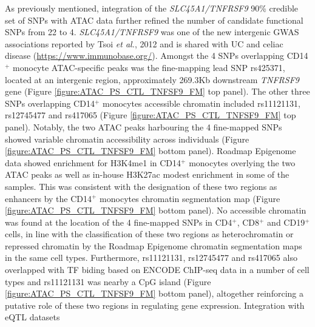 As previously mentioned, integration of the \textit{SLC45A1/TNFRSF9} 90\% credible set of SNPs with ATAC data further refined the number of candidate functional SNPs from 22 to 4. \textit{SLC45A1/TNFRSF9} was one of the new intergenic GWAS associations reported by Tsoi \textit{et al.}, 2012 and is shared with UC and celiac disease (\url{https://www.immunobase.org/}). Amongst the 4 SNPs overlapping CD14$^+$ monocyte ATAC-specific peaks was the fine-mapping lead SNP rs425371, located at an intergenic region, approximately 269.3Kb downstream \textit{TNFRSF9} gene (Figure \ref{figure:ATAC_PS_CTL_TNFSF9_FM} top panel). The other three SNPs overlapping CD14$^+$ monocytes accessible chromatin included rs11121131, rs12745477 and rs417065 (Figure \ref{figure:ATAC_PS_CTL_TNFSF9_FM} top panel). Notably, the two ATAC peaks harbouring the 4 fine-mapped SNPs showed variable chromatin accessibility across individuals (Figure \ref{figure:ATAC_PS_CTL_TNFSF9_FM} bottom panel). Roadmap Epigenome data showed enrichment for H3K4me1 in CD14$^+$ monocytes overlying the two ATAC peaks as well as in-house H3K27ac modest enrichment in some of the samples. This was consistent with the designation of these two regions as enhancers by the CD14$^+$ monocytes chromatin segmentation map (Figure \ref{figure:ATAC_PS_CTL_TNFSF9_FM} bottom panel). No accessible chromatin was found at the location of the 4 fine-mapped SNPs in CD4$^+$, CD8$^+$ and CD19$^+$ cells, in line with the classification of these two regions as heterochromatin or repressed chromatin by the Roadmap Epigenome chromatin segmentation maps in the same cell types. Furthermore, rs11121131, rs12745477 and rs417065 also overlapped with TF biding based on ENCODE ChIP-seq data in a number of cell types and rs11121131 was nearby a CpG island (Figure \ref{figure:ATAC_PS_CTL_TNFSF9_FM} bottom panel), altogether reinforcing a putative role of these two regions in regulating gene expression. Integration with eQTL datasets    

